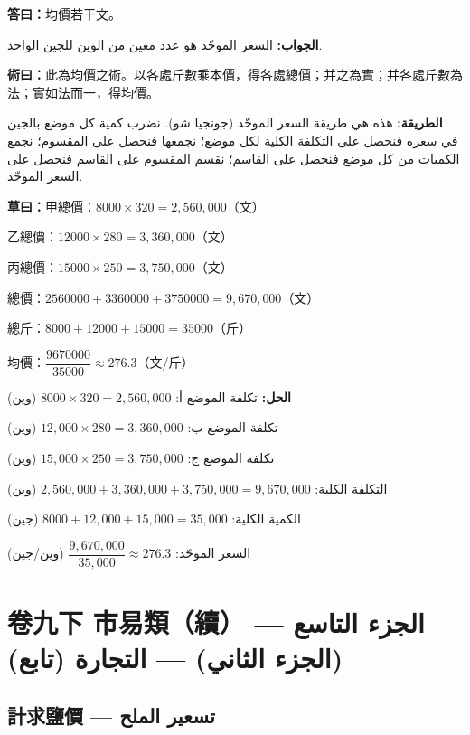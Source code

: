 \documentclass[11pt,a4paper]{article}
\newcommand{\ar}[1]{\arabicfont\beginR #1\endR}
\newcommand{\answer}[2]{\par\noindent%
  \begin{minipage}[t]{0.48\textwidth}\textbf{答曰：}#1\end{minipage}%
  \hfill%
  \begin{minipage}[t]{0.48\textwidth}\arabicfont\beginR\textbf{الجواب:} #2\endR\end{minipage}\par\vspace{0.2cm}}
\newcommand{\method}[2]{\par\noindent%
  \begin{minipage}[t]{0.48\textwidth}\textbf{術曰：}#1\end{minipage}%
  \hfill%
  \begin{minipage}[t]{0.48\textwidth}\arabicfont\beginR\textbf{الطريقة:} #2\endR\end{minipage}\par\vspace{0.3cm}}
\newcommand{\working}[2]{\par\noindent%
  \begin{minipage}[t]{0.48\textwidth}\textbf{草曰：}#1\end{minipage}%
  \hfill%
  \begin{minipage}[t]{0.48\textwidth}\arabicfont\beginR\textbf{الحل:} #2\endR\end{minipage}\par\vspace{0.2cm}}
\begin{document}
\answer{均價若干文。}{السعر الموحّد هو عدد معين من الوين للجين الواحد.}

\method{此為均價之術。以各處斤數乘本價，得各處總價；并之為實；并各處斤數為法；實如法而一，得均價。}{هذه هي طريقة السعر الموحّد (جونجيا شو). نضرب كمية كل موضع بالجين في سعره فنحصل على التكلفة الكلية لكل موضع؛ نجمعها فنحصل على المقسوم؛ نجمع الكميات من كل موضع فنحصل على القاسم؛ نقسم المقسوم على القاسم فنحصل على السعر الموحّد.}

\working{甲總價：$8000 \times 320 = 2{,}560{,}000$（文）

乙總價：$12000 \times 280 = 3{,}360{,}000$（文）

丙總價：$15000 \times 250 = 3{,}750{,}000$（文）

總價：$2560000 + 3360000 + 3750000 = 9{,}670{,}000$（文）

總斤：$8000 + 12000 + 15000 = 35000$（斤）

均價：$\dfrac{9670000}{35000} \approx 276.3$（文/斤）}{تكلفة الموضع أ: $8000 \times 320 = 2{,}560{,}000$ (وين)

تكلفة الموضع ب: $12{,}000 \times 280 = 3{,}360{,}000$ (وين)

تكلفة الموضع ج: $15{,}000 \times 250 = 3{,}750{,}000$ (وين)

التكلفة الكلية: $2{,}560{,}000 + 3{,}360{,}000 + 3{,}750{,}000 = 9{,}670{,}000$ (وين)

الكمية الكلية: $8000 + 12{,}000 + 15{,}000 = 35{,}000$ (جين)

السعر الموحّد: $\dfrac{9{,}670{,}000}{35{,}000} \approx 276.3$ (وين/جين)}

\newpage

\section{卷九下 \quad 市易類（續） — \ar{الجزء التاسع (الجزء الثاني) — التجارة (تابع)}}
\label{sec:fasc9b}

\subsection{計求鹽價 — \ar{تسعير الملح}}
\end{document}
